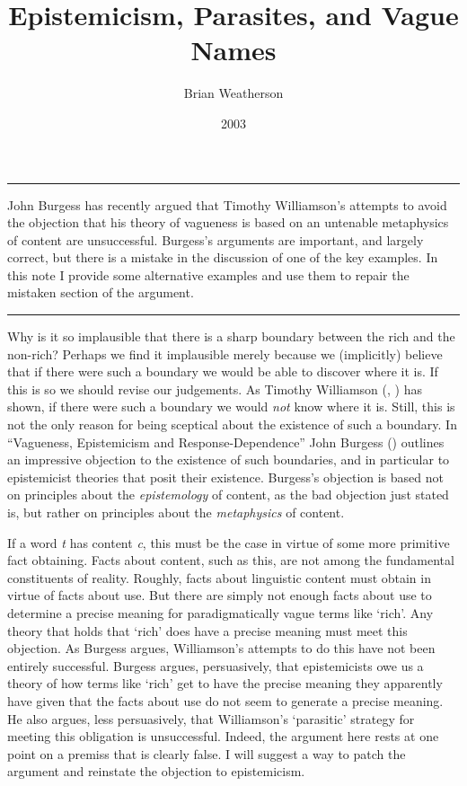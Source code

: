 \documentclass[
  10pt,
  letterpaper,
  DIV=11,
  numbers=noendperiod,
  twoside]{scrartcl}
\title{Epistemicism, Parasites, and Vague Names}
\author{Brian Weatherson}
\date{2003}
\renewenvironment{abstract}
 {\vspace{-1.25cm}
 \quotation\small\noindent\rule{\linewidth}{.5pt}\par\smallskip
 \noindent }
 {\par\noindent\rule{\linewidth}{.5pt}\endquotation}
\begin{document}
\maketitle
\begin{abstract}
John Burgess has recently argued that Timothy Williamson's attempts to
avoid the objection that his theory of vagueness is based on an
untenable metaphysics of content are unsuccessful. Burgess's arguments
are important, and largely correct, but there is a mistake in the
discussion of one of the key examples. In this note I provide some
alternative examples and use them to repair the mistaken section of the
argument.
\end{abstract}

Why is it so implausible that there is a sharp boundary between the rich
and the non-rich? Perhaps we find it implausible merely because we
(implicitly) believe that if there were such a boundary we would be able
to discover where it is. If this is so we should revise our judgements.
As Timothy Williamson (,
) has shown, if there were
such a boundary we would \emph{not} know where it is. Still, this is not
the only reason for being sceptical about the existence of such a
boundary. In ``Vagueness, Epistemicism and Response-Dependence'' John
Burgess () outlines an impressive
objection to the existence of such boundaries, and in particular to
epistemicist theories that posit their existence. Burgess's objection is
based not on principles about the \emph{epistemology} of content, as the
bad objection just stated is, but rather on principles about the
\emph{metaphysics} of content.

If a word \emph{t} has content \emph{c}, this must be the case in virtue
of some more primitive fact obtaining. Facts about content, such as
this, are not among the fundamental constituents of reality. Roughly,
facts about linguistic content must obtain in virtue of facts about use.
But there are simply not enough facts about use to determine a precise
meaning for paradigmatically vague terms like `rich'. Any theory that
holds that `rich' does have a precise meaning must meet this objection.
As Burgess argues, Williamson's attempts to do this have not been
entirely successful. Burgess argues, persuasively, that epistemicists
owe us a theory of how terms like `rich' get to have the precise meaning
they apparently have given that the facts about use do not seem to
generate a precise meaning. He also argues, less persuasively, that
Williamson's `parasitic' strategy for meeting this obligation is
unsuccessful. Indeed, the argument here rests at one point on a premiss
that is clearly false. I will suggest a way to patch the argument and
reinstate the objection to epistemicism.
\end{document}
